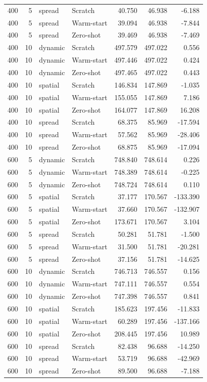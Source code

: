 \begin{tabular}{rrllrrr}
400 & 5 & spread & Scratch & 40.750 & 46.938 & -6.188 \\
400 & 5 & spread & Warm-start & 39.094 & 46.938 & -7.844 \\
400 & 5 & spread & Zero-shot & 39.469 & 46.938 & -7.469 \\
400 & 10 & dynamic & Scratch & 497.579 & 497.022 & 0.556 \\
400 & 10 & dynamic & Warm-start & 497.446 & 497.022 & 0.424 \\
400 & 10 & dynamic & Zero-shot & 497.465 & 497.022 & 0.443 \\
400 & 10 & spatial & Scratch & 146.834 & 147.869 & -1.035 \\
400 & 10 & spatial & Warm-start & 155.055 & 147.869 & 7.186 \\
400 & 10 & spatial & Zero-shot & 164.077 & 147.869 & 16.208 \\
400 & 10 & spread & Scratch & 68.375 & 85.969 & -17.594 \\
400 & 10 & spread & Warm-start & 57.562 & 85.969 & -28.406 \\
400 & 10 & spread & Zero-shot & 68.875 & 85.969 & -17.094 \\
600 & 5 & dynamic & Scratch & 748.840 & 748.614 & 0.226 \\
600 & 5 & dynamic & Warm-start & 748.389 & 748.614 & -0.225 \\
600 & 5 & dynamic & Zero-shot & 748.724 & 748.614 & 0.110 \\
600 & 5 & spatial & Scratch & 37.177 & 170.567 & -133.390 \\
600 & 5 & spatial & Warm-start & 37.660 & 170.567 & -132.907 \\
600 & 5 & spatial & Zero-shot & 173.671 & 170.567 & 3.104 \\
600 & 5 & spread & Scratch & 50.281 & 51.781 & -1.500 \\
600 & 5 & spread & Warm-start & 31.500 & 51.781 & -20.281 \\
600 & 5 & spread & Zero-shot & 37.156 & 51.781 & -14.625 \\
600 & 10 & dynamic & Scratch & 746.713 & 746.557 & 0.156 \\
600 & 10 & dynamic & Warm-start & 747.111 & 746.557 & 0.554 \\
600 & 10 & dynamic & Zero-shot & 747.398 & 746.557 & 0.841 \\
600 & 10 & spatial & Scratch & 185.623 & 197.456 & -11.833 \\
600 & 10 & spatial & Warm-start & 60.289 & 197.456 & -137.166 \\
600 & 10 & spatial & Zero-shot & 208.445 & 197.456 & 10.989 \\
600 & 10 & spread & Scratch & 82.438 & 96.688 & -14.250 \\
600 & 10 & spread & Warm-start & 53.719 & 96.688 & -42.969 \\
600 & 10 & spread & Zero-shot & 89.500 & 96.688 & -7.188 \\
\bottomrule
\end{tabular}